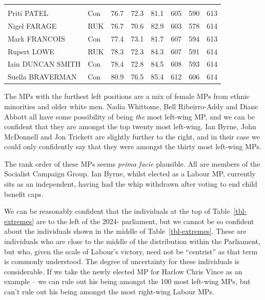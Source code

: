 \documentclass[
]{article}
\begin{document}
\begin{table}
{\begin{tabular}[t]{llrrrrrr}
\addlinespace[0.3em]
\multicolumn{8}{l}{\textbf{Right-wing}}\\
\hspace{1em}Priti PATEL & Con & 76.7 & 72.3 & 81.1 & 605 & 590 & 613\\
\hspace{1em}Nigel FARAGE & RUK & 76.7 & 70.6 & 82.9 & 603 & 578 & 614\\
\hspace{1em}Mark FRANCOIS & Con & 77.4 & 73.1 & 81.7 & 607 & 594 & 613\\
\hspace{1em}Rupert LOWE & RUK & 78.3 & 72.3 & 84.3 & 607 & 591 & 614\\
\hspace{1em}Iain DUNCAN SMITH & Con & 78.4 & 72.8 & 84.5 & 608 & 593 & 614\\
\hspace{1em}Suella BRAVERMAN & Con & 80.9 & 76.5 & 85.4 & 612 & 606 & 614\\
\bottomrule
\end{tabular}

}

\end{table}%

The MPs with the furthest left positions are a mix of female MPs from
ethnic minorities and older white men. Nadia Whittome, Bell
Ribeirro-Addy and Diane Abbott all have some possibility of being
\emph{the} most left-wing MP, and we can be confident that they are
amongst the top twenty most left-wing. Ian Byrne, John McDonnell and Jon
Trickett are slightly further to the right, and in their case we could
only confidently say that they were amongst the thirty most left-wing
MPs.

The rank order of these MPs seems \emph{prima facie} plausible. All are
members of the Socialist Campaign Group. Ian Byrne, whilst elected as a
Labour MP, currently sits as an independent, having had the whip
withdrawn after voting to end child benefit caps.

We can be reasonably confident that the individuals at the top of
Table~\ref{tbl-extremes} are to the left of the 2024- parliament, but we
cannot be so confident about the individuals shown in the middle of
Table~\ref{tbl-extremes}. These are individuals who are close to the
middle of the distribution within the Parliament, but who, given the
scale of Labour's victory, need not be ``centrist'' as that term is
commonly understood. The degree of uncertainty for these individuals is
considerable. If we take the newly elected MP for Harlow Chris Vince as
an example -- we can rule out his being amongst the 100 most left-wing
MPs, but can't rule out his being amongst the most right-wing Labour
MPs.
\end{document}
